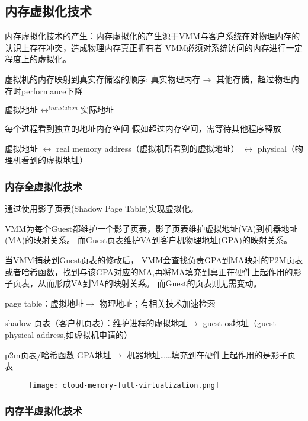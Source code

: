 \subsection{内存虚拟化技术}

内存虚拟化技术的产生：内存虚拟化的产生源于VMM与客户系统在对物理内存的认识上存在冲突，造成物理内存真正拥有者-VMM必须对系统访问的内存进行一定程度上的虚拟化。 

虚拟机的内存映射到真实存储器的顺序: 真实物理内存$\rightarrow$ 其他存储，️超过物理内存时performance下降

$虚拟地址\leftrightarrow^{translation}实际地址$

每个进程看到独立的地址内存空间
假如超过内存空间，需等待其他程序释放

虚拟地址 $\leftrightarrow$ real memory address（虚拟机所看到的虚拟地址） $\leftrightarrow$ physical（物理机看到的虚拟地址）

\subsubsection{内存全虚拟化技术}

通过使用影子页表(Shadow Page Table)实现虚拟化。 

VMM为每个Guest都维护一个影子页表，影子页表维护虚拟地址(VA)到机器地址(MA)的映射关系。 而Guest页表维护VA到客户机物理地址(GPA)的映射关系。 

当VMM捕获到Guest页表的修改后， VMM会查找负责GPA到MA映射的P2M页表或者哈希函数，找到与该GPA对应的MA,再将MA填充到真正在硬件上起作用的影子页表，从而形成VA到MA的映射关系。 而Guest的页表则无需变动。 

page table：虚拟地址$\rightarrow$ 物理地址；有相关技术加速检索

shadow 页表（客户机页表）：维护进程的虚拟地址$\rightarrow$ guest os地址（guest physical address,如虚拟机申请的）

p2m页表/哈希函数 GPA地址$\rightarrow$ 机器地址……填充到在硬件上起作用的是影子页表


\begin{figure}[htbp]
    \begin{center}
        \texttt{[image: cloud-memory-full-virtualization.png]}
    \end{center}
\end{figure}


\subsubsection{内存半虚拟化技术}

